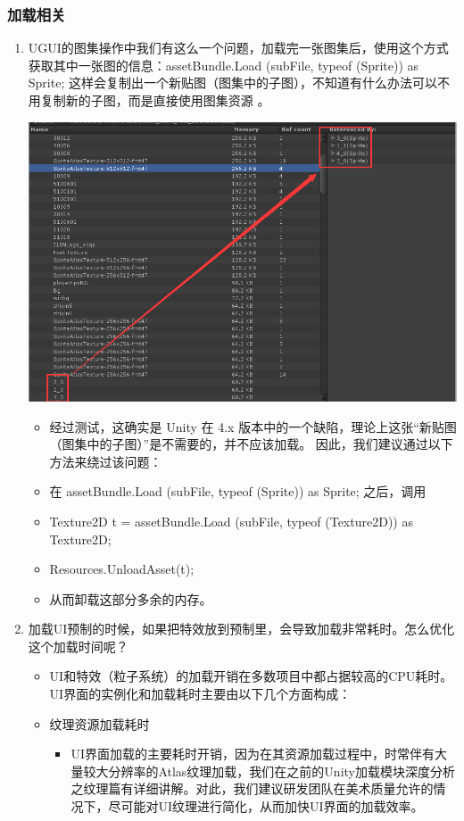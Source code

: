 \documentclass[9pt, b5paper]{article}
\begin{document}
\subsubsection{加载相关}
\label{sec:org812c5e6}
\begin{enumerate}
\item UGUI的图集操作中我们有这么一个问题，加载完一张图集后，使用这个方式获取其中一张图的信息：assetBundle.Load (subFile, typeof (Sprite)) as Sprite; 这样会复制出一个新贴图（图集中的子图），不知道有什么办法可以不用复制新的子图，而是直接使用图集资源 。
\label{sec:org4f0ee18}

\begin{center}
\includegraphics[width=.9\linewidth]{./pic/ugui4.png}
\end{center}
\begin{itemize}
\item 经过测试，这确实是 Unity 在 4.x 版本中的一个缺陷，理论上这张“新贴图（图集中的子图）”是不需要的，并不应该加载。 因此，我们建议通过以下方法来绕过该问题：
\item 在 assetBundle.Load (subFile, typeof (Sprite)) as Sprite; 之后，调用
\item Texture2D t = assetBundle.Load (subFile, typeof (Texture2D)) as Texture2D;
\item Resources.UnloadAsset(t);
\item 从而卸载这部分多余的内存。
\end{itemize}
\item 加载UI预制的时候，如果把特效放到预制里，会导致加载非常耗时。怎么优化这个加载时间呢？
\label{sec:org478c293}
\begin{itemize}
\item UI和特效（粒子系统）的加载开销在多数项目中都占据较高的CPU耗时。UI界面的实例化和加载耗时主要由以下几个方面构成：
\item 纹理资源加载耗时
\begin{itemize}
\item UI界面加载的主要耗时开销，因为在其资源加载过程中，时常伴有大量较大分辨率的Atlas纹理加载，我们在之前的Unity加载模块深度分析之纹理篇有详细讲解。对此，我们建议研发团队在美术质量允许的情况下，尽可能对UI纹理进行简化，从而加快UI界面的加载效率。
\end{itemize}


\end{itemize}
\end{enumerate}
\end{document}

